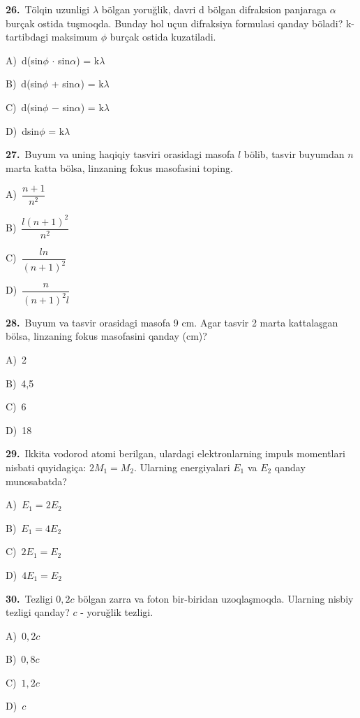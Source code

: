 \documentclass[11pt,a4paper]{article}
\newcommand{\opt}[2]{\hspace*{4mm}#1)\ #2\par}
\begin{document}
\noindent\begin{minipage}{\linewidth}
\textbf{26.}\ Tölqin uzunligi $\lambda$ bölgan yoruğlik, davri d bölgan difraksion panjaraga $\alpha$ burçak ostida tuşmoqda. Bunday hol uçun difraksiya formulasi qanday böladi? k-tartibdagi maksimum $\phi$ burçak ostida kuzatiladi.\par\smallskip
\opt{A}{d(sin$\phi$ $\cdot$ sin$\alpha$) = k$\lambda$}
\opt{B}{d(sin$\phi$ + sin$\alpha$) = k$\lambda$}
\opt{C}{d(sin$\phi$ $-$ sin$\alpha$) = k$\lambda$}
\opt{D}{dsin$\phi$ = k$\lambda$}
\end{minipage}\vspace{9pt}\par
\noindent\begin{minipage}{\linewidth}
\textbf{27.}\ Buyum va uning haqiqiy tasviri orasidagi masofa $l$ bölib, tasvir buyumdan $n$ marta katta bölsa, linzaning fokus masofasini toping.\par\smallskip
\opt{A}{$\dfrac{n+1}{n^2}$}
\opt{B}{$\dfrac{l(n+1)^2}{n^2}$}
\opt{C}{$\dfrac{ln}{(n+1)^2}$}
\opt{D}{$\dfrac{n}{(n+1)^2l}$}
\end{minipage}\vspace{9pt}\par
\noindent\begin{minipage}{\linewidth}
\textbf{28.}\ Buyum va tasvir orasidagi masofa 9 cm. Agar tasvir 2 marta kattalaşgan bölsa, linzaning fokus masofasini qanday (cm)?\par\smallskip
\opt{A}{2}
\opt{B}{4,5}
\opt{C}{6}
\opt{D}{18}
\end{minipage}\vspace{9pt}\par
\noindent\begin{minipage}{\linewidth}
\textbf{29.}\ Ikkita vodorod atomi berilgan, ulardagi elektronlarning impuls momentlari nisbati quyidagiça: $2M_1 = M_2$. Ularning energiyalari $E_1$ va $E_2$ qanday munosabatda?\par\smallskip
\opt{A}{$E_1 = 2E_2$}
\opt{B}{$E_1 = 4E_2$}
\opt{C}{$2E_1 = E_2$}
\opt{D}{$4E_1 = E_2$}
\end{minipage}\vspace{9pt}\par
\noindent\begin{minipage}{\linewidth}
\textbf{30.}\ Tezligi $0{,}2c$ bölgan zarra va foton bir-biridan uzoqlaşmoqda. Ularning nisbiy tezligi qanday? $c$ - yoruğlik tezligi.\par\smallskip
\opt{A}{$0{,}2c$}
\opt{B}{$0{,}8c$}
\opt{C}{$1{,}2c$}
\opt{D}{$c$}
\end{minipage}\vspace{9pt}\par
\end{document}
